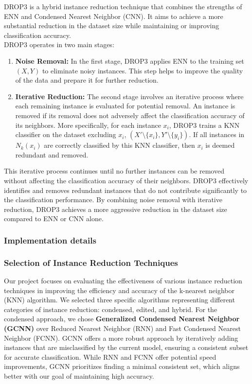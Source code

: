 DROP3 \cite{Wilson2000} is a hybrid instance reduction technique that combines the strengths of ENN and 
Condensed Nearest Neighbor (CNN). It aims to achieve a more substantial reduction in the dataset size while 
maintaining or improving classification accuracy.\\

DROP3 operates in two main stages:

\begin{enumerate}
    \item \textbf{Noise Removal:} In the first stage, DROP3 applies ENN to the training set $(X, Y)$ to eliminate noisy instances. This step helps to improve the quality of the data and prepare it for further reduction. 
    \item \textbf{Iterative Reduction:} The second stage involves an iterative process where each remaining instance is evaluated for potential removal. An instance is removed if its removal does not adversely affect the classification accuracy of its neighbors.  More specifically, for each instance $x_i$, DROP3 trains a KNN classifier on the dataset excluding $x_i$, $(X' \setminus \{x_i\}, Y' \setminus \{y_i\})$. If all instances in $N_k(x_i)$ are correctly classified by this KNN classifier, then $x_i$ is deemed redundant and removed.
\end{enumerate}

This iterative process continues until no further instances can be removed without affecting the classification accuracy of their neighbors. DROP3 effectively identifies and removes redundant instances that do not contribute significantly to the classification performance. By combining noise removal with iterative reduction, DROP3 achieves a more aggressive reduction in the dataset size compared to ENN or CNN alone.


\subsubsection{Implementation details}


\subsubsection*{Selection of Instance Reduction Techniques}
Our project focuses on evaluating the effectiveness of various instance reduction techniques in improving
the efficiency and accuracy of the k-nearest neighbor (KNN) algorithm.  We selected three specific algorithms
representing different categories of instance reduction: condensed, edited, and hybrid. For the condensed approach,
we chose \textbf{Generalized Condensed Nearest Neighbor (GCNN)} over Reduced Nearest Neighbor (RNN) and Fast Condensed Nearest Neighbor (FCNN). 
GCNN offers a more robust approach by iteratively adding instances that are misclassified by the current model,
ensuring a consistent subset for accurate classification. While RNN and FCNN offer potential speed improvements,
GCNN prioritizes finding a minimal consistent set, which aligns better with our goal of maintaining high accuracy.

